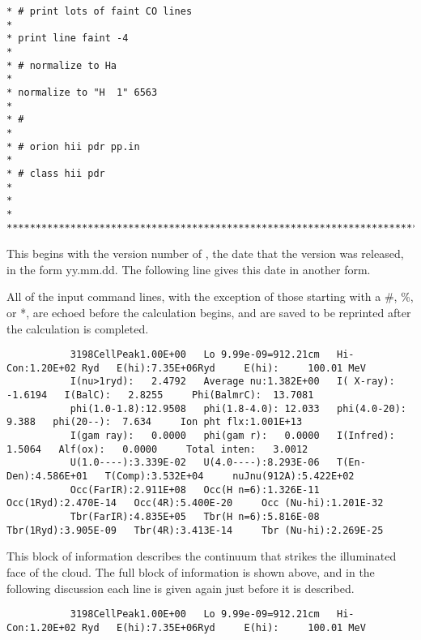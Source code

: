 {\begin{verbatim}
* # print lots of faint CO lines                                                  *
* print line faint -4                                                             *
* # normalize to Ha                                                               *
* normalize to "H  1" 6563                                                        *
* #                                                                               *
* # orion hii pdr pp.in                                                           *
* # class hii pdr                                                                 *
*                                                                                 *
***********************************************************************************
\end{verbatim}
}

This begins with the version number of \Cloudy, the date that the version
was released, in the form yy.mm.dd.
The following line gives this date
in another form.

All of the input command lines, with the exception of those starting
with a \#, \%, or *, are echoed before the calculation begins,
and are saved
to be reprinted after the calculation is completed.
{\setverbatimfontsize{\tiny}
\begin{verbatim}
           3198CellPeak1.00E+00   Lo 9.99e-09=912.21cm   Hi-Con:1.20E+02 Ryd   E(hi):7.35E+06Ryd     E(hi):     100.01 MeV
           I(nu>1ryd):   2.4792   Average nu:1.382E+00   I( X-ray):  -1.6194   I(BalC):   2.8255     Phi(BalmrC):  13.7081
           phi(1.0-1.8):12.9508   phi(1.8-4.0): 12.033   phi(4.0-20):  9.388   phi(20--):  7.634     Ion pht flx:1.001E+13
           I(gam ray):   0.0000   phi(gam r):   0.0000   I(Infred):   1.5064   Alf(ox):   0.0000     Total inten:   3.0012
           U(1.0----):3.339E-02   U(4.0----):8.293E-06   T(En-Den):4.586E+01   T(Comp):3.532E+04     nuJnu(912A):5.422E+02
           Occ(FarIR):2.911E+08   Occ(H n=6):1.326E-11   Occ(1Ryd):2.470E-14   Occ(4R):5.400E-20     Occ (Nu-hi):1.201E-32
           Tbr(FarIR):4.835E+05   Tbr(H n=6):5.816E-08   Tbr(1Ryd):3.905E-09   Tbr(4R):3.413E-14     Tbr (Nu-hi):2.269E-25
\end{verbatim}
}
This block of information describes the continuum that strikes the
illuminated face of the cloud.
The full block of information is shown above,
and in the following discussion each line is given again
just before it is described.
{\setverbatimfontsize{\tiny}
\begin{verbatim}
           3198CellPeak1.00E+00   Lo 9.99e-09=912.21cm   Hi-Con:1.20E+02 Ryd   E(hi):7.35E+06Ryd     E(hi):     100.01 MeV
\end{verbatim}
}

